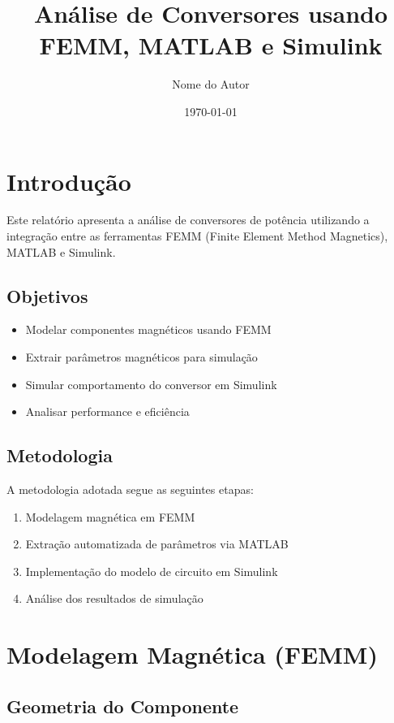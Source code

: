 \documentclass[12pt, a4paper]{article}
\title{Análise de Conversores usando FEMM, MATLAB e Simulink}
\author{Nome do Autor}
\date{\today}
\begin{document}
\maketitle

\tableofcontents
\newpage

\section{Introdução}

Este relatório apresenta a análise de conversores de potência utilizando a integração entre as ferramentas FEMM (Finite Element Method Magnetics), MATLAB e Simulink.

\subsection{Objetivos}

\begin{itemize}
    \item Modelar componentes magnéticos usando FEMM
    \item Extrair parâmetros magnéticos para simulação
    \item Simular comportamento do conversor em Simulink
    \item Analisar performance e eficiência
\end{itemize}

\subsection{Metodologia}

A metodologia adotada segue as seguintes etapas:

\begin{enumerate}
    \item Modelagem magnética em FEMM
    \item Extração automatizada de parâmetros via MATLAB
    \item Implementação do modelo de circuito em Simulink
    \item Análise dos resultados de simulação
\end{enumerate}

\section{Modelagem Magnética (FEMM)}

\subsection{Geometria do Componente}
\end{document}
